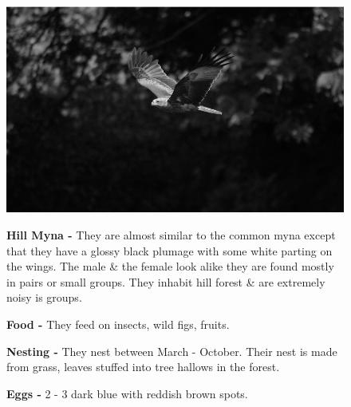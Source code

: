 \begin{figure}[H]
\begin{center}
\includegraphics{figure/Land_birds/01_pariah_kite/pariah-kite.eps}
\end{center}
\medskip
\noindent
{\bf Hill Myna -} They are almost similar to the common myna except that they have a glossy black plumage with some white parting on the wings. The male \& the female look alike they are found mostly in pairs or small groups. They inhabit hill forest \& are extremely noisy is groups. 

\medskip
{\bf Food -} They feed on insects, wild figs, fruits.

{\bf Nesting -} They nest between March - October. Their nest is made from grass, leaves stuffed into tree hallows in the forest.

{\bf Eggs -} 2 - 3 dark blue with reddish brown spots.
\end{figure}

\vfill\eject

~\phantom{a}
\vfill

